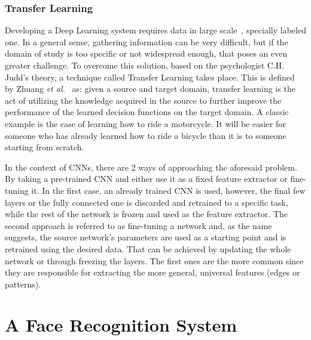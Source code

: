 \documentclass[class=report, crop=false, a4paper, 12pt]{standalone}
\begin{document}
\label{transf learning}
\subsubsection{Transfer Learning} %
\par Developing a Deep Learning system requires data in large scale~\autocite{parkhiDeepFaceRecognition2015}, specially labeled one. In a general sense, gathering information can be very difficult, but if the domain of study is too specific or not widespread enough, that poses an even greater challenge. To overcome this solution, based on the psychologist C.H. Judd's theory, a technique called Transfer Learning takes place. This is defined by Zhuang \textit{et al.}~\autocite{zhuangComprehensiveSurveyTransfer2020} as: given a source and target domain, transfer learning is the act of utilizing the knowledge acquired in the source to further improve the performance of the learned decision functions on the target domain. A classic example is the case of learning how to ride a motorcycle. It will be easier for someone who has already learned how to ride a bicycle than it is to someone starting from scratch.
\par In the context of CNNs, there are 2 ways of approaching the aforesaid problem. By taking a pre-trained CNN and either use it as a fixed feature extractor or fine-tuning it. In the first case, an already trained CNN is used, however, the final few layers or the fully connected one is discarded and retrained to a specific task, while the rest of the network is frozen and used as the feature extractor. The second approach is referred to as fine-tuning a network and, as the name suggests, the source network's parameters are used as a starting point and is retrained using the desired data. That can be achieved by updating the whole network or through freezing the layers. The first ones are the more common since they are responsible for extracting the more general, universal features (edges or patterns).


\newpage
\section{A Face Recognition System}

\end{document}
